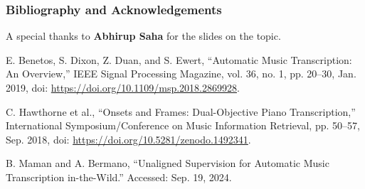 \documentclass{beamer}
\newcommand{\emp}[1]{\textcolor{tum}{\textbf{#1}}}
\begin{document}
\begin{frame}[allowframebreaks]
	\frametitle{Bibliography and Acknowledgements}

	A special thanks to \emp{Abhirup Saha} for the slides on the topic.

	\vspace{5mm}

	
	\begin{thebibliography}{BenetosMusicTranscription}

		E. Benetos, S. Dixon, Z. Duan, and S. Ewert, “Automatic Music Transcription: An Overview,” IEEE Signal Processing Magazine, vol. 36, no. 1, pp. 20–30, Jan. 2019, doi: \url{https://doi.org/10.1109/msp.2018.2869928}.

		C. Hawthorne et al., “Onsets and Frames: Dual-Objective Piano Transcription,” International Symposium/Conference on Music Information Retrieval, pp. 50–57, Sep. 2018, doi: \url{https://doi.org/10.5281/zenodo.1492341}.

		B. Maman and A. Bermano, “Unaligned Supervision for Automatic Music Transcription in-the-Wild.” Accessed: Sep. 19, 2024.

	\end{thebibliography}
\end{frame}
\end{document}
